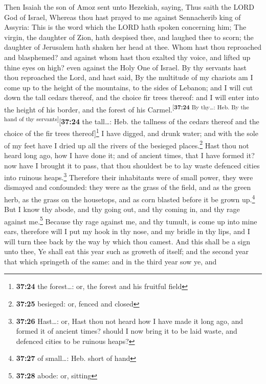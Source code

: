  Then Isaiah the son of Amoz sent unto Hezekiah, saying,
Thus saith the LORD God of Israel, Whereas thou hast prayed to me
against Sennacherib king of Assyria:  This is the word
which the LORD hath spoken concerning him; The virgin, the daughter of
Zion, hath despised thee, and laughed thee to scorn; the daughter of
Jerusalem hath shaken her head at thee.  Whom hast thou
reproached and blasphemed? and against whom hast thou exalted thy voice,
and lifted up thine eyes on high? even against the Holy One of Israel.
 By thy servants hast thou reproached the Lord, and hast
said, By the multitude of my chariots am I come up to the height of the
mountains, to the sides of Lebanon; and I will cut down the tall cedars
thereof, and the choice fir trees thereof: and I will enter into the
height of his border, and the forest of his
Carmel.\textsuperscript{{[}\textbf{37:24} By thy\ldots: Heb. By the hand
of thy servants{]}}{[}\textbf{37:24} the tall\ldots: Heb. the tallness
of the cedars thereof and the choice of the fir trees
thereof{]}\footnote{\textbf{37:24} the forest\ldots: or, the forest and
  his fruitful field}  I have digged, and drunk water;
and with the sole of my feet have I dried up all the rivers of the
besieged places.\footnote{\textbf{37:25} besieged: or, fenced and closed}
 Hast thou not heard long ago, how I have done it; and of
ancient times, that I have formed it? now have I brought it to pass,
that thou shouldest be to lay waste defenced cities into ruinous
heaps.\footnote{\textbf{37:26} Hast\ldots: or, Hast thou not heard how I
  have made it long ago, and formed it of ancient times? should I now
  bring it to be laid waste, and defenced cities to be ruinous heaps?}
 Therefore their inhabitants were of small power, they
were dismayed and confounded: they were as the grass of the field, and
as the green herb, as the grass on the housetops, and as corn blasted
before it be grown up.\footnote{\textbf{37:27} of small\ldots: Heb.
  short of hand}  But I know thy abode, and thy going
out, and thy coming in, and thy rage against me.\footnote{\textbf{37:28}
  abode: or, sitting}  Because thy rage against me, and
thy tumult, is come up into mine ears, therefore will I put my hook in
thy nose, and my bridle in thy lips, and I will turn thee back by the
way by which thou camest.  And this shall be a sign unto
thee, Ye shall eat this year such as groweth of itself; and the second
year that which springeth of the same: and in the third year sow ye, and

